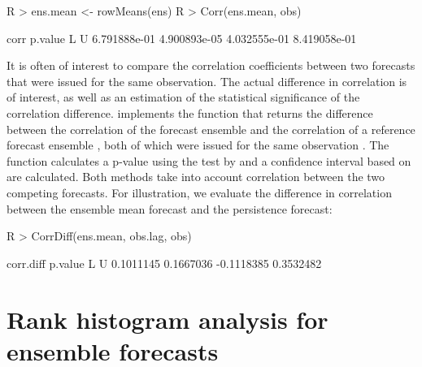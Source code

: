 \documentclass[article]{jss}
\begin{document}
\begin{Schunk}
\begin{Sinput}
R > ens.mean <- rowMeans(ens)
R > Corr(ens.mean, obs)
\end{Sinput}
\begin{Soutput}
        corr      p.value            L            U 
6.791888e-01 4.900893e-05 4.032555e-01 8.419058e-01 
\end{Soutput}
\end{Schunk}


It is often of interest to compare the correlation coefficients between two forecasts that were issued for the same observation.
The actual difference in correlation is of interest, as well as an estimation of the statistical significance of the correlation difference.
 implements the function  that returns the difference between the correlation of the forecast ensemble  and the correlation of a reference forecast ensemble , both of which were issued for the same observation .
The function calculates a p-value using the test by \citet{steiger1980tests} and a confidence interval based on \citet{zou2007toward} are calculated.
Both methods take into account correlation between the two competing forecasts.
For illustration, we evaluate the difference in correlation between the ensemble mean forecast and the persistence forecast:


\begin{Schunk}
\begin{Sinput}
R > CorrDiff(ens.mean, obs.lag, obs)
\end{Sinput}
\begin{Soutput}
 corr.diff    p.value          L          U 
 0.1011145  0.1667036 -0.1118385  0.3532482 
\end{Soutput}
\end{Schunk}




\section{Rank histogram analysis for ensemble forecasts}
\end{document}
